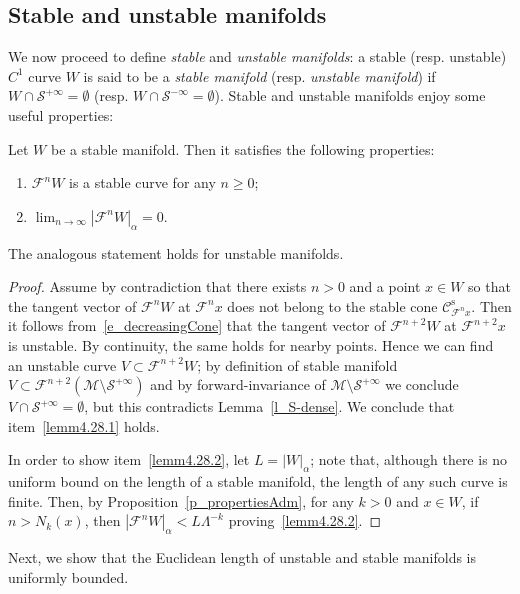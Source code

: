 \documentclass[AHL, Unicode, longabstracts,published]{cedram}
\newcommand{\stable}{\text{s}}
\newcommand{\cm}{\mathcal{F}}
\newcommand{\csp}{\mathcal{M}}
\newcommand{\cone}{\mathcal{C}}
\newcommand{\cones}{\cone^\stable}
\newcommand{\singPrivate}{\mathcal{S}}
\newcommand{\sing}[1]{\singPrivate^{#1}}
\newcommand{\adm}{_{\alpha^{+}}}
\newcommand*\DS{\displaystyle}
\renewcommand{\adm}{_{\alpha}}
\newcommand*{\relabel}{\renewcommand{\labelenumi}{(\theenumi)}}
\newcommand*{\alphenumi}{\renewcommand*{\theenumi}{\alph{enumi}}\relabel}
\begin{document}
\subsection{Stable and unstable manifolds}\label{sec:stable-unst-mflds}
We now proceed to define \emph{stable} and \emph{unstable manifolds}: a stable (resp. unstable) $C^{1}$ curve $W$ is said to be a
\emph{stable manifold} (resp. \emph{unstable manifold}) if $W\cap\sing{+\infty} = \emptyset$ (resp. $W\cap\sing{-\infty} = \emptyset$). Stable and unstable manifolds enjoy some useful properties:
\begin{lemm}\label{lem:properties_stable_mfolds}
Let $W$ be a stable manifold. Then it satisfies the following properties:
\begin{enumerate}\alphenumi
\item\label{lemm4.28.1} $\cm^{n}W$ is a stable curve for any $n\ge 0$;
\item\label{lemm4.28.2} $\DS \lim_{n\to\infty}|\cm^{n}W|\adm = 0$.
\end{enumerate}
The analogous statement holds for unstable manifolds.
\end{lemm}
\begin{proof}
Assume by contradiction that there exists $n > 0$ and a point $x\in W$ so that the tangent vector of $\cm^{n}W$ at $\cm^{n}x$ does not belong to the stable cone $\cones_{\cm^{n}x}$. Then it follows from~\eqref{e_decreasingCone} that the tangent vector of $\cm^{n+2}W$ at $\cm^{n+2}x$ is unstable. By continuity, the same holds for nearby points. Hence we can find an unstable curve $V\subset\cm^{n+2}W$; by definition of stable manifold $V\subset\cm^{n+2}(\csp\setminus\sing{+\infty})$ and by forward-invariance of $\csp\setminus\sing{+\infty}$ we conclude $V\cap\sing{+\infty} = \emptyset$, but this contradicts Lemma~\ref{l_S-dense}. We conclude that item~\eqref{lemm4.28.1} holds.

In order to show item~\eqref{lemm4.28.2}, let $L = |W|\adm$; note that, although there is no uniform bound on the length of a stable manifold, the length of any such curve is finite. Then, by Proposition~\ref{p_propertiesAdm}, for any $k > 0$ and $x\in W$, if $n > N_{k}(x)$, then $|\cm^{n}W|\adm < L\Lambda^{-k}$ proving~\eqref{lemm4.28.2}.
\end{proof}


Next, we show that the Euclidean length of unstable and stable manifolds is uniformly bounded.
\end{document}
